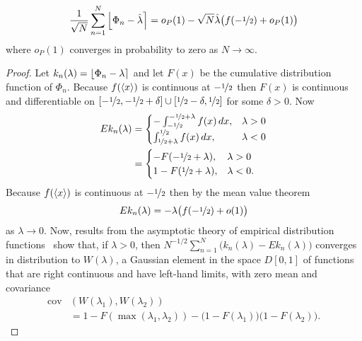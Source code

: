 \documentclass[journal]{IEEEtran}
\begin{document}
\begin{lemma}\label{lem:EI_n}
\[
\frac{1}{\sqrt{N}}\sum_{n=1}^{N} {\left\lfloor  \Phi_n - \hat{\lambda} \right\rceil} = o_P(1) - \sqrt{N}\hat{\lambda}\big( f(-\nicefrac{1}{2}) + o_P(1) \big)
\]
where $o_P(1)$ converges in probability to zero as $N\rightarrow\infty$.
\end{lemma}
\begin{proof}
Let $k_n(\lambda) = {\left\lfloor \Phi_n - \lambda \right\rceil}$ and let $F(x)$ be the cumulative distribution function of $\Phi_n$.  Because $f(\left< x \right>)$ is continuous at $-\nicefrac{1}{2}$ then $F(x)$ is continuous and differentiable on $[-\nicefrac{1}{2}, -\nicefrac{1}{2} + \delta] \cup [\nicefrac{1}{2} - \delta, \nicefrac{1}{2}]$ for some $\delta > 0$.  Now
\begin{align*}
E k_n(\lambda) &= \begin{cases}
-\int_{-\nicefrac{1}{2}}^{-\nicefrac{1}{2} + \lambda}f(x)\,dx, &  \lambda > 0 \\
\int_{\nicefrac{1}{2} + \lambda}^{\nicefrac{1}{2}}f(x)\,dx, &  \lambda < 0
\end{cases} \\
&= \begin{cases}
-F(-\nicefrac{1}{2} + \lambda), &  \lambda > 0 \\
1 - F(\nicefrac{1}{2} + \lambda), &  \lambda < 0.
\end{cases} 
\end{align*}
Because $f(\left< x \right>)$ is continuous at $-\nicefrac{1}{2}$ then by the mean value theorem
\[
E k_n(\lambda) = -\lambda \big( f(-\nicefrac{1}{2}) + o(1) \big)
\] 
as $\lambda \rightarrow 0$.  Now, results from the asymptotic theory of empirical distribution functions~\cite[Theorem 14.3, p. 149]{Billingsley1999_convergence_of_probability_measures} show that, if $\lambda > 0$, then $N^{-1/2} \sum_{n=1}^{N} \big( k_n(\lambda) - Ek_n(\lambda) \big)$ converges in distribution to $W(\lambda)$, a Gaussian element in the space $D[0,1]$ of functions that are right continuous and have left-hand limits, with zero mean and covariance
\begin{align*}
\operatorname{cov}&( W(\lambda_1), W(\lambda_2) ) \\
&= 1 - F( \max(\lambda_1, \lambda_2) ) - \big( 1 - F(\lambda_1)  \big) \big( 1 - F(\lambda_2)  \big).
\end{align*}


\end{proof}
\end{document}
